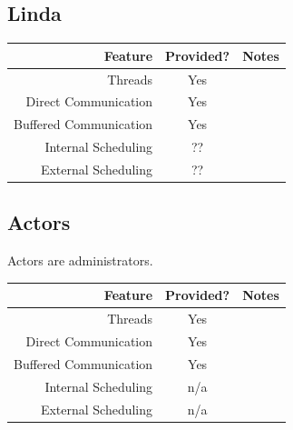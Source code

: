             \subsection{Linda} %
            \label{sub:linda}
                \begin{table}[h]
                    \label{tbl:linda}
                    \centering
                    \begin{tabular}{| r || c | c |}
                        \hline
                        Feature                 & Provided? & Notes \\ \hline \hline
                        Threads                 & Yes & \\ \hline
                        Direct Communication    & Yes & \\ \hline
                        Buffered Communication  & Yes & \\ \hline
                        Internal Scheduling     & ?? & \\ \hline
                        External Scheduling     & ?? & \\ \hline
                    \end{tabular}
                \end{table}
            \subsection{Actors} %
            \label{sub:actors}
                Actors are administrators.
                \begin{table}[h]
                    \label{tbl:actors}
                    \centering
                    \begin{tabular}{| r || c | c |}
                        \hline
                        Feature                 & Provided? & Notes \\ \hline \hline
                        Threads                 & Yes & \\ \hline
                        Direct Communication    & Yes & \\ \hline
                        Buffered Communication  & Yes & \\ \hline
                        Internal Scheduling     & n/a & \\ \hline
                        External Scheduling     & n/a & \\ \hline
                    \end{tabular}
                \end{table}

